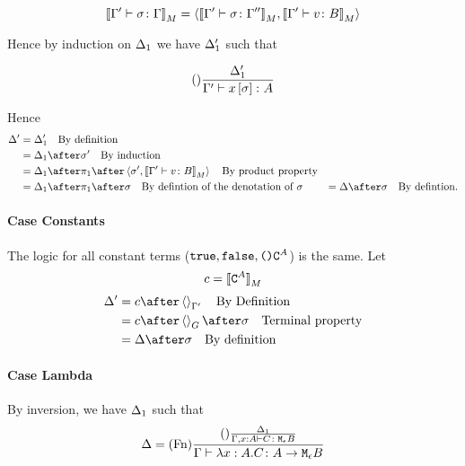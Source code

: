 {    \begin{equation}
        {\bf [\![}\Gamma' \vdash \sigma \colon \Gamma{\bf ]\!]}_M = \left\langle{\bf [\![}\Gamma' \vdash \sigma \colon \Gamma''{\bf ]\!]}_M, {\bf [\![}\Gamma' \vdash v \colon B{\bf ]\!]}_M\right\rangle
    \end{equation}

    Hence by induction on $\Delta_1$ we have $\Delta_1'$ such that

    \begin{equation}
        (\text{}) \frac{\Delta_1'}{\Gamma' \vdash x\left[\sigma\right] \colon A}
    \end{equation}



    Hence
    \begin{align}
        \D' & = \D_1' \qt{By definition}\\
            & = \D_1\after\si'\qt{By induction}\\
            & = \D_1\after\p\after\pr{\si'}{\deno{\typerelation{\G'}{v}{B}}}\qt{By product property}\\
            & = \D_1\after\p\after\si\qt{By defintion of the denotation of $\si$}
            & = \D\after\si\qt{By defintion.}
    \end{align}

    \paragraph{Case Constants}
    The logic for all constant terms ($\texttt{true},\texttt{false},\texttt{()}\texttt{C}^{A}$) is the same.
    Let
    \begin{equation}
        c = {\bf [\![}\texttt{C}^{A}{\bf ]\!]}_M
    \end{equation}
    \begin{align}
        \D' & = c\after\term{\G'}\qt{By Definition}\\
            & = c\after\term{G}\after\si\qt{Terminal property}\\
            & = \D\after\si\qt{By definition}
    \end{align}
    \paragraph{Case Lambda}

    By inversion, we have $\Delta_1$ such that
    \begin{equation}
        \Delta = (\text{Fn}) \frac{
            (\text{}) \frac{\Delta_1}{\Gamma, x:A \vdash C \colon \texttt{M}_{\epsilon}{B}}
        }{\Gamma \vdash \lambda x : A. C \colon A \rightarrow \texttt{M}_{\epsilon}{B}}
    \end{equation}

}
